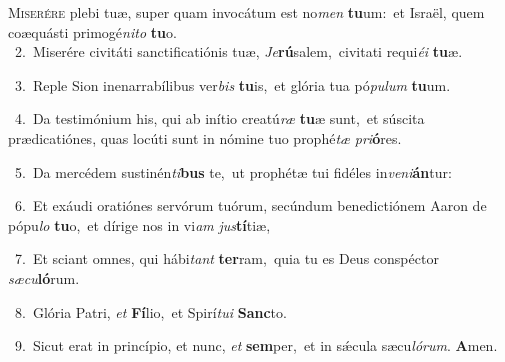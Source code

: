 \lettrine{\initial\textcolor{\initialcolor}{M}}{iserére} plebi tuæ, super quam invocátum est no\textit{men} \textbf{tu}\-um:~\star et Israël, quem coæquásti primogé\-\textit{ni}\-\textit{to} \textbf{tu}\-o.\\
{\numbfont\textcolor{\numbcolor}{~2.}}~Miserére civitáti sanctificatiónis tuæ, \textit{Je}\-\textbf{rú}salem,~\star civitati requi\-\textit{é}\-\textit{i} \textbf{tu}\-æ.\par
{\numbfont\textcolor{\numbcolor}{~3.}}~Reple Sion inenarrabílibus ver\textit{bis} \textbf{tu}\-is,~\star et glória tua pó\-\textit{pu}\-\textit{lum} \textbf{tu}\-um.\par
{\numbfont\textcolor{\numbcolor}{~4.}}~Da testimónium his, qui ab inítio creatú\textit{ræ} \textbf{tu}\-æ sunt,~\star et súscita prædicatiónes, quas locúti sunt in nómine tuo prophé\textit{tæ} \textit{pri}\-\textbf{ó}res.\par
{\numbfont\textcolor{\numbcolor}{~5.}}~Da mercédem sustinén\-\textit{ti}\-\textbf{bus} te,~\star ut prophétæ tui fidéles in\-\textit{ve}\-\textit{ni}\textbf{án}tur:\par
{\numbfont\textcolor{\numbcolor}{~6.}}~Et exáudi oratiónes servórum tuórum, secúndum benedictiónem Aaron de pópu\textit{lo} \textbf{tu}\-o,~\star et dírige nos in vi\textit{am} \textit{jus}\-\textbf{tí}tiæ,\par
{\numbfont\textcolor{\numbcolor}{~7.}}~Et sciant omnes, qui hábi\textit{tant} \textbf{ter}\-ram,~\star quia tu es Deus conspéctor \textit{sæ}\-\textit{cu}\textbf{ló}rum.\par
{\numbfont\textcolor{\numbcolor}{~8.}}~Glória Patri, \textit{et} \textbf{Fí}\-lio,~\star et Spirí\-\textit{tu}\-\textit{i} \textbf{Sanc}\-to.\par
{\numbfont\textcolor{\numbcolor}{~9.}}~Sicut erat in princípio, et nunc, \textit{et} \textbf{sem}\-per,~\star et in sǽcula sæcu\-\textit{ló}\-\textit{rum}. \textbf{A}\-men.\par

